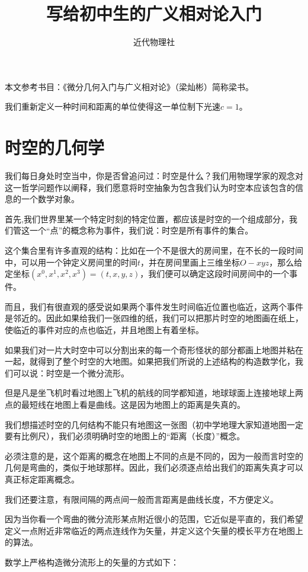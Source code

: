 \documentclass{article}
\begin{document}
\title{写给初中生的广义相对论入门}
\author{近代物理社}
\maketitle
本文参考书目：《微分几何入门与广义相对论》（梁灿彬）简称梁书。

我们重新定义一种时间和距离的单位使得这一单位制下光速$c=1$。
\section{时空的几何学}
我们每日身处时空当中，你是否曾追问过：时空是什么？我们用物理学家的观念对这一哲学问题作以阐释，我们愿意将时空抽象为包含我们认为时空本应该包含的信息的一个数学对象。

首先,我们世界里某一个特定时刻的特定位置，都应该是时空的一个组成部分，我们管这一个“点”的概念称为事件，我们说：时空是所有事件的集合。

这个集合里有许多直观的结构：比如在一个不是很大的房间里，在不长的一段时间中，可以用一个钟定义房间里的时间$t$，并在房间里画上三维坐标$O-xyz$，那么给定坐标$(x^0,x^1,x^2,x^3)=(t,x,y,z)$，我们便可以确定这段时间房间中的一个事件。

而且，我们有很直观的感受说如果两个事件发生时间临近位置也临近，这两个事件是邻近的。因此如果给我们一张四维的纸，我们可以把那片时空的地图画在纸上，使临近的事件对应的点也临近，并且地图上有着坐标。

如果我们对一片大时空中可以分割出来的每一个奇形怪状的部分都画上地图并粘在一起，就得到了整个时空的大地图。如果把我们所说的上述结构的构造数学化，我们可以说：时空是一个微分流形。

但是凡是坐飞机时看过地图上飞机的航线的同学都知道，地球球面上连接地球上两点的最短线在地图上看是曲线。这是因为地图上的距离是失真的。

我们想描述时空的几何结构不能只有地图这一张图（初中学地理大家知道地图一定要有比例尺），我们必须明确时空的地图上的“距离（长度）”概念。

必须注意的是，这个距离的概念在地图上不同的点是不同的，因为一般而言时空的几何是弯曲的，类似于地球那样。因此，我们必须逐点给出我们的距离失真才可以真正标定距离概念。

我们还要注意，有限间隔的两点间一般而言距离是曲线长度，不方便定义。

因为当你看一个弯曲的微分流形某点附近很小的范围，它近似是平直的，我们希望定义一点附近非常临近的两点连线作为矢量，并定义这个矢量的模长平方在地图上的算法。

数学上严格构造微分流形上的矢量的方式如下：
\end{document}

